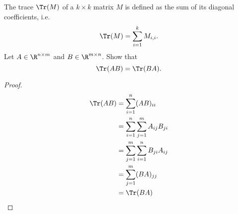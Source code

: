 \documentclass[11pt,nocut]{article}
\begin{document}
\begin{problem}[$\star$]
	The trace $\Tr(M)$ of a $k \times k$ matrix $M$ is defined as the sum of its diagonal coefficients, i.e.
	$$
	\Tr(M) = \sum_{i=1}^k M_{i,i}.
	$$
	Let $A \in \R^{n \times m}$ and $B \in \R^{m \times n}$. Show that
	$$
	\Tr(AB) = \Tr(BA).
	$$
	\begin{proof}
	$$
	\begin{aligned}
	\Tr(AB) 	&= \sum_{i=1}^{n}(AB)_{ii}\\
			&= \sum_{i=1}^n \sum_{j=1}^m A_{ij}B_{ji} \\
			&= \sum_{j=1}^m \sum_{i=1}^n B_{ji}A_{ij} \\
			&= \sum_{j=1}^m(BA)_{jj} \\
			&= \Tr(BA)
	\end{aligned}
	$$
	\end{proof}
\end{problem}
\vspace{1cm}
\centerline{}

%
%
\end{document}
